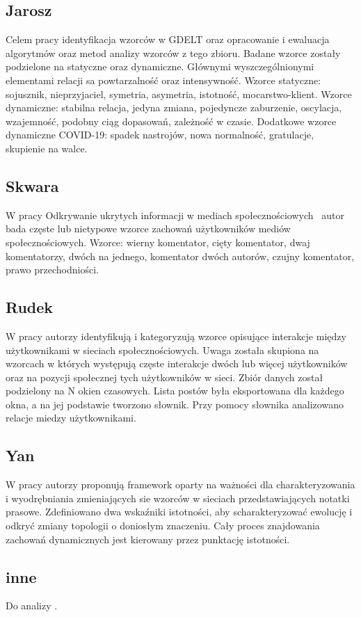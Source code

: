 \subsection{Jarosz}\label{subsec:jarosz}
Celem pracy \cite{Jarosz2020} identyfikacja wzorców w GDELT oraz opracowanie i ewaluacja algorytmów oraz metod analizy wzorców z tego zbioru\@.
Badane wzorce zostały podzielone na statyczne oraz dynamiczne.
Głównymi wyszczególnionymi elementami relacji sa powtarzalność oraz intensywność.
Wzorce statyczne: sojusznik, nieprzyjaciel, symetria, asymetria, istotność, mocarstwo-klient.
Wzorce dynamiczne: stabilna relacja, jedyna zmiana, pojedyncze zaburzenie, oscylacja, wzajemność, podobny ciąg dopasowań, zależność w czasie.
Dodatkowe wzorce dynamiczne COVID-19: spadek nastrojów, nowa normalność, gratulacje, skupienie na walce.

\subsection{Skwara}\label{subsec:skwara}
W pracy Odkrywanie ukrytych informacji w mediach społecznościowych~\cite{Skwara2019} autor bada częste lub nietypowe wzorce zachowań użytkowników mediów społecznościowych.
Wzorce: wierny komentator, cięty komentator, dwaj komentatorzy, dwóch na jednego, komentator dwóch autorów, czujny komentator, prawo przechodniości.

\subsection{Rudek}\label{subsec:rudek}
W pracy \cite{10.1093/jigpal/jzaa042} autorzy identyfikują i kategoryzują wzorce opisujące interakcje między użytkownikami w sieciach społecznościowych.
Uwaga została skupiona na wzorcach w których występują częste interakcje dwóch lub więcej użytkowników oraz na pozycji społecznej tych użytkowników w sieci.
Zbiór danych został podzielony na N okien czasowych.
Lista postów była eksportowana dla każdego okna, a na jej podstawie tworzono słownik.
Przy pomocy słownika analizowano relacje miedzy użytkownikami.

\subsection{Yan}\label{subsec:yan}
W pracy \cite{Yan2012} autorzy proponują framework oparty na ważności dla charakteryzowania i wyodrębniania zmieniających sie wzorców w sieciach przedstawiających notatki prasowe.
Zdefiniowano dwa wskaźniki istotności, aby scharakteryzować ewolucję i odkryć zmiany topologii o doniosłym znaczeniu.
Cały proces znajdowania zachowań dynamicznych jest kierowany przez punktację istotności.

\subsection{inne}\label{subsec:inne}
Do analizy \cite{Buckingham2020,Levin2018,Yuan2017}.